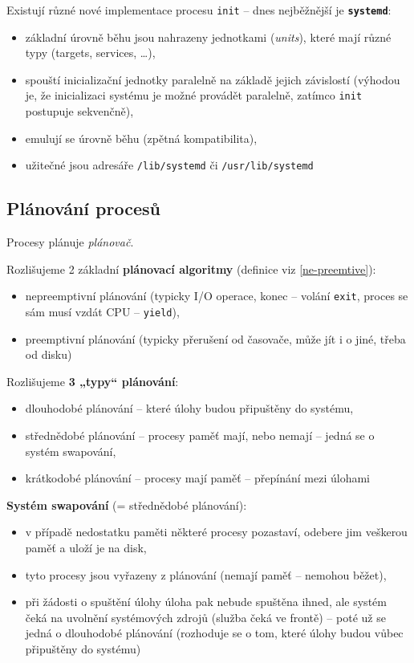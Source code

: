 \documentclass[a4paper, 11pt]{article}
\newcommand{\tcmd}[1]{\texttt{#1}}
\newcommand{\lpath}[1]{\texttt{#1}}
\begin{document}
Existují různé nové implementace procesu \tcmd{init} -- dnes nejběžnější je \tcmd{\textbf{systemd}}:
\begin{itemize}
    \item základní úrovně běhu jsou nahrazeny jednotkami (\emph{units}), které mají různé typy (targets, services, \ldots),
    \item spouští inicializační jednotky paralelně na základě jejich závislostí (výhodou je, že inicializaci systému je možné provádět paralelně, zatímco \tcmd{init} postupuje sekvenčně),
    \item emulují se úrovně běhu (zpětná kompatibilita),
    \item užitečné jsou adresáře \lpath{/lib/systemd} či \lpath{/usr/lib/systemd}
\end{itemize}
 
\subsection{Plánování procesů} \label{planovani}
Procesy plánuje \emph{plánovač}.
 
Rozlišujeme 2 základní \textbf{plánovací algoritmy} (definice viz \ref{ne-preemtive}):
\begin{itemize}
    \item nepreemptivní plánování (typicky I/O operace, konec -- volání \tcmd{exit}, proces se sám musí vzdát CPU -- \tcmd{yield}),
    \item preemptivní plánování (typicky přerušení od časovače, může jít i o jiné, třeba od disku)
\end{itemize}

Rozlišujeme \textbf{3 „typy“ plánování}:
\begin{itemize}
    \item dlouhodobé plánování -- které úlohy budou připuštěny do systému,
    \item střednědobé plánování -- procesy paměť mají, nebo nemají -- jedná se o systém swapování,
    \item krátkodobé plánování -- procesy mají paměť -- přepínání mezi úlohami
\end{itemize}
 
\textbf{Systém swapování} (= střednědobé plánování):
\begin{itemize}
    \item v případě nedostatku paměti některé procesy pozastaví, odebere jim veškerou paměť a uloží je na disk,
    \item tyto procesy jsou vyřazeny z plánování (nemají paměť -- nemohou běžet),
    \item při žádosti o spuštění úlohy úloha pak nebude spuštěna ihned, ale systém čeká na uvolnění systémových zdrojů (služba čeká ve frontě) -- poté už se jedná o dlouhodobé plánování (rozhoduje se o tom, které úlohy budou vůbec připuštěny do systému)
\end{itemize}
 
\end{document}
